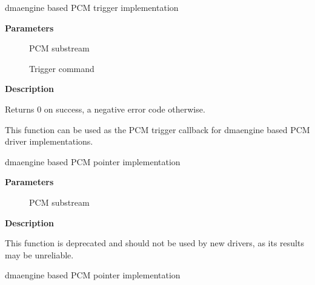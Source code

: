 \documentclass[a4paper,8pt,english]{sphinxmanual}
\begin{document}
\begin{fulllineitems}
\label{sound/kernel-api/alsa-driver-api:c.snd_dmaengine_pcm_trigger}
dmaengine based PCM trigger implementation

\end{fulllineitems}


\textbf{Parameters}
\begin{description}
\item[{}] \leavevmode
PCM substream

\item[{}] \leavevmode
Trigger command

\end{description}

\textbf{Description}

Returns 0 on success, a negative error code otherwise.

This function can be used as the PCM trigger callback for dmaengine based PCM
driver implementations.

\begin{fulllineitems}
\label{sound/kernel-api/alsa-driver-api:c.snd_dmaengine_pcm_pointer_no_residue}
dmaengine based PCM pointer implementation

\end{fulllineitems}


\textbf{Parameters}
\begin{description}
\item[{}] \leavevmode
PCM substream

\end{description}

\textbf{Description}

This function is deprecated and should not be used by new drivers, as its
results may be unreliable.

\begin{fulllineitems}
\label{sound/kernel-api/alsa-driver-api:c.snd_dmaengine_pcm_pointer}
dmaengine based PCM pointer implementation

\end{fulllineitems}
\end{document}
